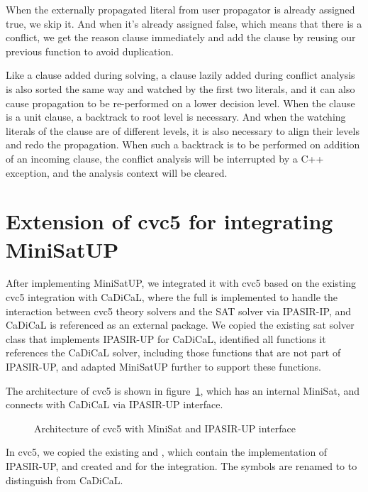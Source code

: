 When the externally propagated literal from user propagator is already assigned true, we skip it. And when it's already assigned false, which means that there is a conflict, we get the reason clause immediately and add the clause by reusing our previous function  to avoid duplication.

Like a clause added during solving, a clause lazily added during conflict analysis is also sorted the same way and watched by the first two literals, and it can also cause propagation to be re-performed on a lower decision level. When the clause is a unit clause, a backtrack to root level is necessary. And when the watching literals of the clause are of different levels, it is also necessary to align their levels and redo the propagation. When such a backtrack is to be performed on addition of an incoming clause, the conflict analysis will be interrupted by a C++ exception, and the analysis context will be cleared.

\section{Extension of cvc5 for integrating MiniSatUP}

After implementing MiniSatUP, we integrated it with cvc5 based on the existing cvc5 integration with CaDiCaL, where the full  is implemented to handle the interaction between cvc5 theory solvers and the SAT solver via IPASIR-IP, and CaDiCaL is referenced as an external package. We copied the existing sat solver class that implements IPASIR-UP for CaDiCaL, identified all functions it references the CaDiCaL solver, including those functions that are not part of IPASIR-UP, and adapted MiniSatUP further to support these functions.

The architecture of cvc5 is shown in figure~\ref{fig:cvc5}, which has an internal MiniSat, and connects with CaDiCaL via IPASIR-UP interface.

\begin{figure}
  \centering
  
  \caption{Architecture of cvc5 with MiniSat and IPASIR-UP interface}
  \label{fig:cvc5}
\end{figure}


In cvc5, we copied the existing  and , which contain the implementation of IPASIR-UP, and created  and  for the integration. The symbols are renamed to  to distinguish from CaDiCaL.

